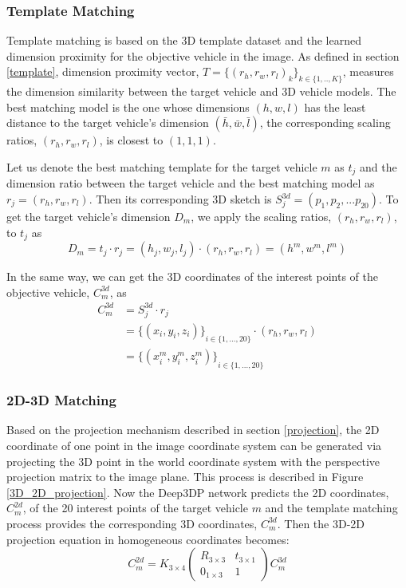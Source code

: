 \documentclass[a4paper,12pt]{article}
\begin{document}
\subsubsection{Template Matching}

Template matching is based on the 3D template dataset and the learned dimension proximity for the objective vehicle in the image. As defined in section \ref{template}, dimension proximity vector, ${T} = \{{(r_h,r_w,r_l)}_k\}_{k \in \{1,.., K\}}$, measures the dimension similarity between the target vehicle and 3D vehicle models. The best matching model is the one whose dimensions $(h, w, l)$ has the least distance to the target vehicle's dimension $(\bar{h}, \bar{w}, \bar{l})$, \ie the corresponding scaling ratios, $(r_h,r_w,r_l)$, is closest to $(1, 1, 1)$. 

Let us denote the best matching template for the target vehicle $m$ as $t_j$ and the dimension ratio between the target vehicle and the best matching model as $r_j = (r_h,r_w,r_l)$. Then its corresponding 3D sketch is $S_j^{3d}  = (p_1, p_2, ... p_{20})$. To get the target vehicle's dimension $D_m$, we apply the scaling ratios, $(r_h,r_w,r_l)$, to $t_j$ as
\begin{equation}
	D_m = t_j \cdot r_j =  (h_j, w_j, l_j) \cdot (r_h,r_w,r_l) = (h^m, w^m, l^m)
\end{equation}

In the same way, we can get the 3D coordinates of the interest points of the objective vehicle, $C_m^{3d}$, as
\begin{align}
C_m^{3d} &= S_j^{3d} \cdot r_j \nonumber \\  
					  &=  {\{(x_i, y_i, z_i)\}}_{i \in \{1, ...,20\}} \cdot (r_h,r_w,r_l) \nonumber \\  
					  &= {\{(x_i^m, y_i^m, z_i^m)\}}_{i \in \{1, ...,20\}} \qquad {} 
\end{align}

\subsubsection{2D-3D Matching}

Based on the projection mechanism described in section \ref{projection}, the 2D coordinate of one point in the image coordinate system can be generated via projecting the 3D point in the world coordinate system with the perspective projection matrix to the image plane. This process is described in Figure \ref{3D_2D_projection}. Now the Deep3DP network predicts the 2D coordinates, $C_m^{2d}$, of the 20 interest points of the target vehicle $m$ and the template matching process provides the corresponding 3D coordinates, $C_m^{3d}$. Then the 3D-2D projection equation in homogeneous coordinates becomes:
\begin{equation}
	C_m^{2d} =   K_{3\times 4}
	\begin{pmatrix}
	R_{3\times 3} & t_{3\times 1}\\ 
	0_{1\times 3}& 1
	\end{pmatrix} C_m^{3d}
\end{equation}
\end{document}
